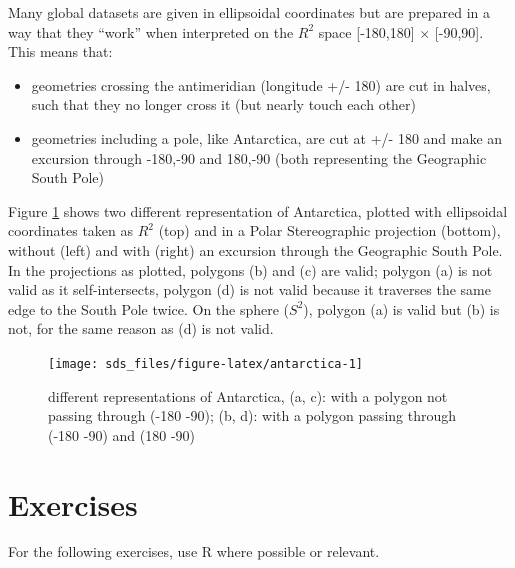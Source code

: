 \documentclass[]{book}
\providecommand{\tightlist}{%
  \setlength{\itemsep}{0pt}\setlength{\parskip}{0pt}}
\begin{document}
Many global datasets are given in ellipsoidal coordinates but are
prepared in a way that they ``work'' when interpreted on the \(R^2\)
space {[}-180,180{]} \(\times\) {[}-90,90{]}. This means that:

\begin{itemize}
\tightlist
\item
  geometries crossing the antimeridian (longitude +/- 180) are cut in
  halves, such that they no longer cross it (but nearly touch each other)
\item
  geometries including a pole, like Antarctica, are cut at +/- 180 and
  make an excursion through -180,-90 and 180,-90 (both representing the
  Geographic South Pole)
\end{itemize}

Figure \ref{fig:antarctica} shows two different representation of
Antarctica, plotted with ellipsoidal coordinates taken as \(R^2\)
(top) and in a Polar Stereographic projection (bottom), without
(left) and with (right) an excursion through the Geographic South
Pole. In the projections as plotted, polygons (b) and
(c) are valid; polygon (a) is not valid as it self-intersects,
polygon (d) is not valid because it traverses the same edge to the
South Pole twice. On the sphere (\(S^2\)), polygon (a) is valid but
(b) is not, for the same reason as (d) is not valid.

\begin{figure}

{\centering \texttt{[image: sds\_files/figure-latex/antarctica-1]} 

}

\caption{different representations of Antarctica, (a, c): with a polygon not passing through (-180 -90); (b, d): with a polygon passing through (-180 -90) and (180 -90)}\label{fig:antarctica}
\end{figure}

\hypertarget{exercises-3}{%
\section{Exercises}\label{exercises-3}}

For the following exercises, use R where possible or relevant.
\end{document}
